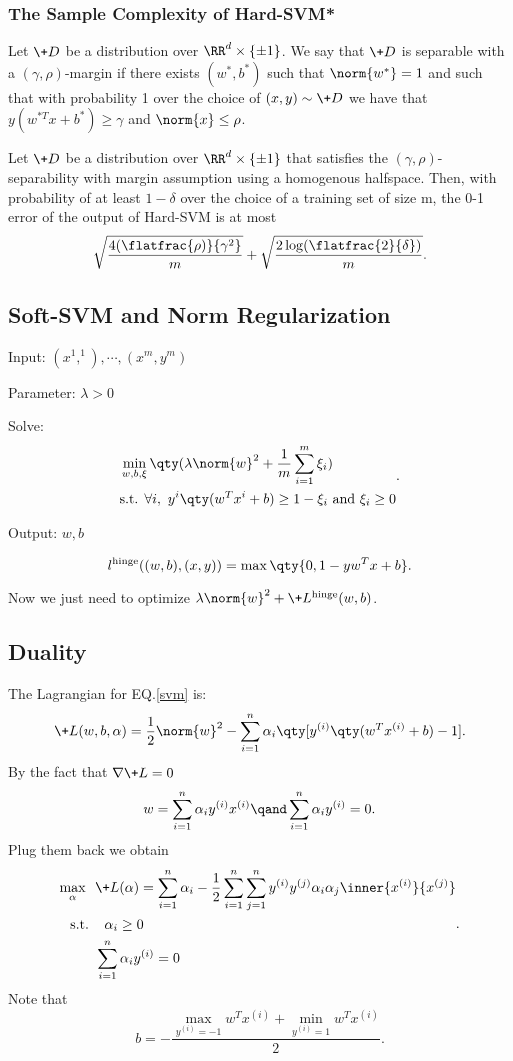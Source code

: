 \subsubsection{The Sample Complexity of Hard-SVM*}
\begin{defi}[Separability]
	Let $\+D$ be a distribution over $\RR^d \times \{\pm1\}$.
	We say that $\+D$ is separable with a $(\gamma,\rho)$-margin if there exists $(w^*,b^*)$ such that $\norm{w^*} = 1$ and such that with probability 1 over the choice of $(x, y) \sim \+D$ we have that $y(w^{*T}x+ b^*)\ge \gamma$ and $\norm{x}\le  \rho$. 
\end{defi}
\begin{thm}
	Let $\+D$ be a distribution over $\RR^d\times\{\pm1\}$ that satisfies the $(\gamma,\rho)$-separability with margin assumption using a homogenous halfspace.
	Then, with probability of at least $1 - \delta$ over the choice of a training set of size m, the 0-1 error of the output of Hard-SVM is at most
	\[
		\sqrt{\frac{4(\flatfrac{\rho)}{\gamma^2}}{m}}+\sqrt{\frac{2\log(\flatfrac{2}{\delta})}{m}}
	.\] 
	
\end{thm}
\subsection{Soft-SVM and Norm Regularization}
\begin{md}
	Input: $(x^1,^1),\cdots,(x^m,y^m)$

	Parameter: $\lambda>0$

	Solve:
	\[
		\begin{aligned}
			& \min_{w,b,\xi}\qty(\lambda\norm{w}^2+\frac{1}{m}\sum_{i=1}^m\xi_i)
			\\
			&\text{s.t. }\forall i,\ y^i\qty(w^Tx^i+b)\ge 1-\xi_i \text{ and }
			\xi_i\ge 0
		\end{aligned}
	.\]

	Output: $w,b$
\end{md}
\begin{defi}
	\[
		l^{\mathrm{hinge}}((w,b),(x,y))=\max\qty{0,1-yw^Tx+b}
	.\]
\end{defi}
Now we just need to optimize $\lambda\norm{w}^2+\+L^{\mathrm{hinge}}(w,b)$.
\subsection{Duality}
The Lagrangian for EQ.\ref{svm} is:
\[
	\+L(w,b,\alpha)=\frac{1}{2}\norm{w}^2-\sum_{i=1}^n\alpha_i\qty[y^{(i)}\qty(w^Tx^{(i)}+b)-1]
.\] 
By the fact that $\nabla\+L=0$
 \[
	 w=\sum^{n}_{i=1} \alpha_iy^{(i)}x^{(i)}
	 \qand
	 \sum^{n}_{i=1} \alpha_iy^{(i)}=0
.\] 
Plug them back we obtain
\[
    \begin{aligned}
		\max_\alpha\ \ & \+L(\alpha)
		=
		\sum^{n}_{i=1} \alpha_i - 
		\frac{1}{2} \sum^{n}_{i=1} \sum^{n}_{j=1}
		y^{(i)}y^{(j)}\alpha_i\alpha_j
		\inner{x^{(i)}}{x^{(j)}}
		\\\text{s.t. }&\ \ 
		\alpha_i\ge 0
		\\&
		\sum^{n}_{i=1} \alpha_iy^{(i)}=0
    \end{aligned}
.\] 
Note that
\[
	b=-\frac{\max_{y^{(i)}=-1}w^Tx^{(i)}+\min_{y^{(i)}=1}w^Tx^{(i)}}{2}
.\] 
